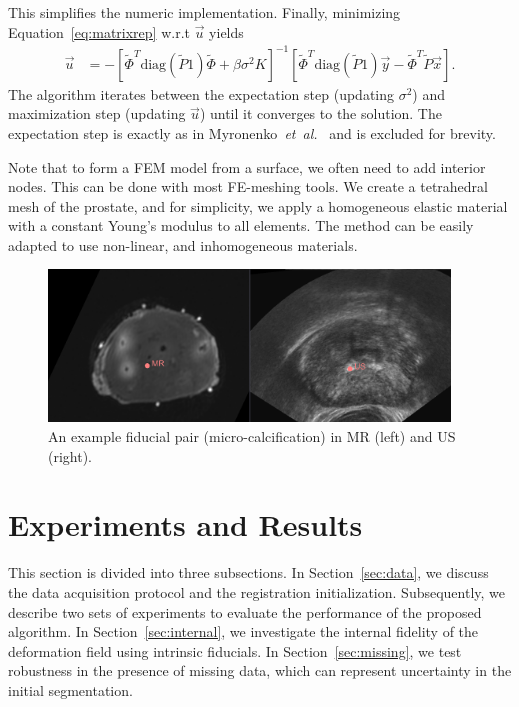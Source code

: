 \documentclass[runningheads,a4paper]{llncs}
\newcommand{\trans}[1]{#1^{T}}
\newcommand{\diag}{\mathrm{diag}}
\begin{document}
This simplifies the numeric implementation. Finally, minimizing Equation~\eqref{eq:matrixrep} w.r.t $\vec{u}$ yields
\begin{align}\label{eq:Mstep}
        \vec{u} & = -\left[\trans{\tilde{\Phi}}\diag\left(\tilde{P}1\right)\tilde{\Phi} 
            + \beta \sigma^2K\right]^{-1}\left[\trans{\tilde{\Phi}}\diag\left(\tilde{P}1\right)\vec{y}
            -\trans{\tilde{\Phi}}\tilde{P}\vec{x}\right].
\end{align}
The algorithm iterates between the expectation step (updating $\sigma^2$) and maximization step (updating $\vec{u}$) until it converges to the solution. The expectation step is exactly as in Myronenko~\textit{et~al.}~\cite{Myronenko10a} and is excluded for brevity.  

Note that to form a FEM model from a surface, we often need to add interior nodes.  This can be done with most FE-meshing tools.  We create a tetrahedral mesh of the prostate, and for simplicity, we apply a homogeneous elastic material with a constant Young's modulus to all elements.  The method can be easily adapted to use non-linear, and inhomogeneous materials.

\begin{figure}[t]
\center
\includegraphics[width = 0.95\textwidth]{images/US_fiducial.png}
\caption{An example fiducial pair (micro-calcification) in MR (left) and US (right).}
\label{fig:fiducial}
\end{figure}
\section{Experiments and Results}\label{sec:exper}
This section is divided into three subsections. In Section~\ref{sec:data}, we discuss the data acquisition protocol and the registration initialization. Subsequently, we describe two sets of experiments to evaluate the performance of the proposed algorithm. In Section~\ref{sec:internal}, we investigate the internal fidelity of the deformation field using intrinsic fiducials. In Section~\ref{sec:missing}, we test robustness in the presence of missing data, which can represent uncertainty in the initial segmentation.
\end{document}
